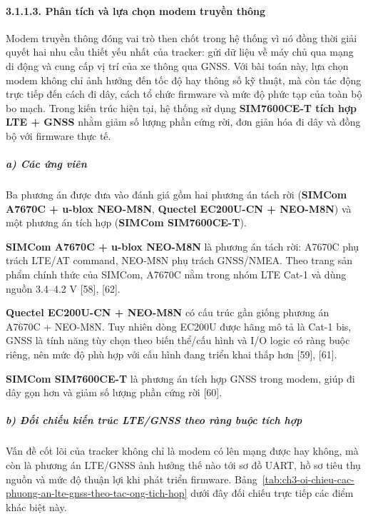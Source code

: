 \documentclass[a4paper]{extarticle}
\newcommand{\tabref}[1]{Bảng~\ref{#1}}
\begin{document}
\paragraph{3.1.1.3. Phân tích và lựa chọn modem truyền
thông}\label{3113-phuxe2n-tuxedch-vuxe0-lux1ef1a-chux1ecdn-modem-truyux1ec1n-thuxf4ng}

Modem truyền thông đóng vai trò then chốt trong hệ thống vì nó đồng thời
giải quyết hai nhu cầu thiết yếu nhất của tracker: gửi dữ liệu về máy chủ
qua mạng di động và cung cấp vị trí của xe thông qua GNSS. Với bài toán
này, lựa chọn modem không chỉ ảnh hưởng đến tốc độ hay thông số kỹ
thuật, mà còn tác động trực tiếp đến cách đi dây, cách tổ chức firmware
và mức độ phức tạp của toàn bộ bo mạch. Trong kiến trúc hiện tại, hệ
thống sử dụng \textbf{SIM7600CE-T tích hợp LTE + GNSS} nhằm giảm số
lượng phần cứng rời, đơn giản hóa đi dây và đồng bộ với firmware thực
tế.

\subparagraph{a) Các ứng viên}\label{a-cuxe1c-ux1ee9ng-viuxean-1}

Ba phương án được đưa vào đánh giá gồm hai phương án tách rời
(\textbf{SIMCom A7670C + u-blox NEO-M8N}, \textbf{Quectel EC200U-CN +
NEO-M8N}) và một phương án tích hợp (\textbf{SIMCom SIM7600CE-T}).

\textbf{SIMCom A7670C + u-blox NEO-M8N} là phương án tách rời: A7670C
phụ trách LTE/AT command, NEO-M8N phụ trách GNSS/NMEA. Theo trang sản
phẩm chính thức của SIMCom, A7670C nằm trong nhóm LTE Cat-1 và dùng
nguồn 3.4--4.2 V {[}58{]}, {[}62{]}.

\textbf{Quectel EC200U-CN + NEO-M8N} có cấu trúc gần giống phương án
A7670C + NEO-M8N. Tuy nhiên dòng EC200U được hãng mô tả là Cat-1 bis,
GNSS là tính năng tùy chọn theo biến thể/cấu hình và I/O logic có ràng
buộc riêng, nên mức độ phù hợp với cấu hình đang triển khai thấp hơn
{[}59{]}, {[}61{]}.

\textbf{SIMCom SIM7600CE-T} là phương án tích hợp GNSS trong modem, giúp
đi dây gọn hơn và giảm số lượng phần cứng rời {[}60{]}.

\subparagraph{b) Đối chiếu kiến trúc LTE/GNSS theo ràng buộc tích
hợp}\label{b-ux111ux1ed1i-chiux1ebfu-kiux1ebfn-truxfac-ltegnss-theo-ruxe0ng-buux1ed9c-tuxedch-hux1ee3p}

Vấn đề cốt lõi của tracker không chỉ là modem có lên mạng được hay
không, mà còn là phương án LTE/GNSS ảnh hưởng thế nào tới sơ đồ UART, hồ
sơ tiêu thụ nguồn và mức độ thuận lợi khi phát triển firmware. \tabref{tab:ch3-oi-chieu-cac-phuong-an-lte-gnss-theo-tac-ong-tich-hop}
dưới đây đối chiếu trực tiếp các điểm khác biệt này.
\end{document}
